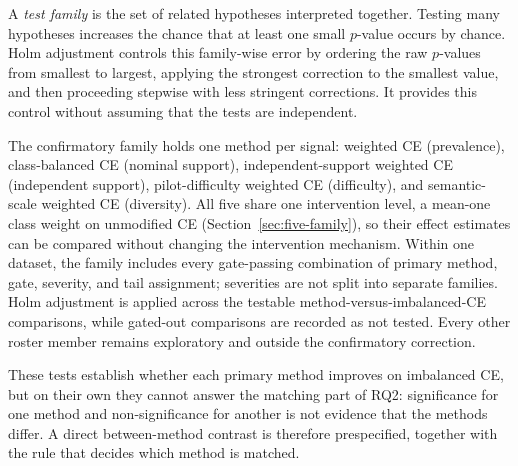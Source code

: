\documentclass[11pt]{article}
\begin{document}
A \emph{test family} is the set of related hypotheses interpreted together. Testing many hypotheses increases the chance that at least one small $p$-value occurs by chance. Holm adjustment controls this family-wise error by ordering the raw $p$-values from smallest to largest, applying the strongest correction to the smallest value, and then proceeding stepwise with less stringent corrections. It provides this control without assuming that the tests are independent.

The confirmatory family holds one method per signal: weighted CE (prevalence), class-balanced CE (nominal support), independent-support weighted CE (independent support), pilot-difficulty weighted CE (difficulty), and semantic-scale weighted CE (diversity). All five share one intervention level, a mean-one class weight on unmodified CE (Section~\ref{sec:five-family}), so their effect estimates can be compared without changing the intervention mechanism. Within one dataset, the family includes every gate-passing combination of primary method, gate, severity, and tail assignment; severities are not split into separate families. Holm adjustment is applied across the testable method-versus-imbalanced-CE comparisons, while gated-out comparisons are recorded as not tested. Every other roster member remains exploratory and outside the confirmatory correction.

These tests establish whether each primary method improves on imbalanced CE, but on their own they cannot answer the matching part of RQ2: significance for one method and non-significance for another is not evidence that the methods differ. A direct between-method contrast is therefore prespecified, together with the rule that decides which method is matched.
\end{document}

